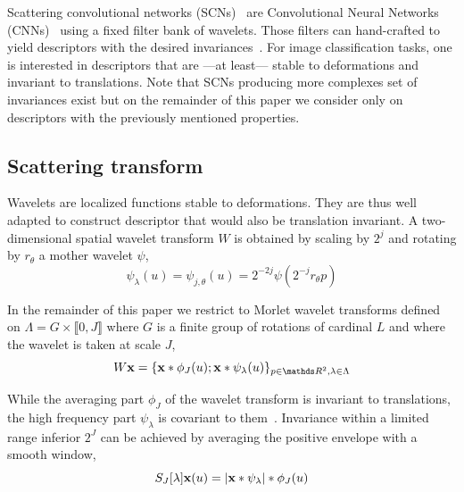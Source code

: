 \documentclass{article}
\begin{document}
    Scattering convolutional networks (SCNs)~\citep{bruna} are Convolutional Neural Networks (CNNs)~\citet{lecun1995convolutional} using a fixed filter bank of wavelets. Those filters can hand-crafted to yield descriptors with the desired invariances~\citep{work translation invariant, work rotation invariant, work rigid motion}. For image classification tasks, one is interested in descriptors that are ---at least--- stable to deformations and invariant to translations. Note that SCNs producing more complexes set of invariances exist but on the remainder of this paper we consider only on descriptors with the previously mentioned properties.
  
  \subsection{Scattering transform}
    \label{subsec:SCN/ST}
    
    Wavelets are localized functions stable to deformations. They are thus well adapted to construct descriptor that would also be translation invariant. A two-dimensional spatial wavelet transform $W$ is obtained by scaling by $2^{j}$ and rotating by $r_{\theta}$ a mother wavelet $\psi$,
    \vspace{-5pt}
    \begin{equation}
      \label{eq:multi-scale directional wavelet}
      \psi_{\lambda}(u) = \psi_{j,\theta}(u) = 2^{-2j} \psi(2^{-j}r_{\theta}p)
    \end{equation}
    
    In the remainder of this paper we restrict to Morlet wavelet transforms defined on $\Lambda = G \times \llbracket 0,J \rrbracket$ where $G$ is a finite group of rotations of cardinal $L$ and where the wavelet is taken at scale $J$,
    \vspace{-5pt}
    \begin{equation}
      \label{eq:wavelet transform}
      W\bfx = \{ \bfx \ast \phi_{J}(u); \bfx \ast \psi_{\lambda}(u) \}_{p\in\dsR^{2},\lambda \in \Lambda}
    \end{equation}
    \vspace{-15pt}

    While the averaging part $\phi_{J}$ of the wavelet transform is invariant to translations, the high frequency part $\psi_{\lambda}$ is covariant to them~\citep{mallat}. Invariance within a limited range inferior $2^{J}$ can be achieved by averaging the positive envelope with a smooth window,
    \vspace{-5pt}
    \begin{equation}
      \label{eq:Scattering transform}
      S_{J}[\lambda]{\bf x}(u) = \left| {\bf x} \ast \psi_{\lambda} \right| \ast \phi_{J}(u)
    \end{equation}
    \vspace{-10pt}
    
\end{document}
